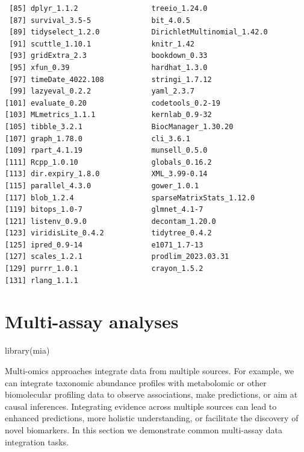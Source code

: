 \documentclass[
]{book}
\newenvironment{Shaded}{\begin{snugshade}}{\end{snugshade}}
\newcommand{\FunctionTok}[1]{\textcolor[rgb]{0.00,0.00,0.00}{#1}}
\newcommand{\NormalTok}[1]{#1}
\begin{document}
\begin{verbatim}
 [85] dplyr_1.1.2                 treeio_1.24.0              
 [87] survival_3.5-5              bit_4.0.5                  
 [89] tidyselect_1.2.0            DirichletMultinomial_1.42.0
 [91] scuttle_1.10.1              knitr_1.42                 
 [93] gridExtra_2.3               bookdown_0.33              
 [95] xfun_0.39                   hardhat_1.3.0              
 [97] timeDate_4022.108           stringi_1.7.12             
 [99] lazyeval_0.2.2              yaml_2.3.7                 
[101] evaluate_0.20               codetools_0.2-19           
[103] MLmetrics_1.1.1             kernlab_0.9-32             
[105] tibble_3.2.1                BiocManager_1.30.20        
[107] graph_1.78.0                cli_3.6.1                  
[109] rpart_4.1.19                munsell_0.5.0              
[111] Rcpp_1.0.10                 globals_0.16.2             
[113] dir.expiry_1.8.0            XML_3.99-0.14              
[115] parallel_4.3.0              gower_1.0.1                
[117] blob_1.2.4                  sparseMatrixStats_1.12.0   
[119] bitops_1.0-7                glmnet_4.1-7               
[121] listenv_0.9.0               decontam_1.20.0            
[123] viridisLite_0.4.2           tidytree_0.4.2             
[125] ipred_0.9-14                e1071_1.7-13               
[127] scales_1.2.1                prodlim_2023.03.31         
[129] purrr_1.0.1                 crayon_1.5.2               
[131] rlang_1.1.1                
\end{verbatim}

\hypertarget{multi-assay-analyses}{%
\chapter{Multi-assay analyses}\label{multi-assay-analyses}}

\begin{Shaded}
\begin{Highlighting}[]
\FunctionTok{library}\NormalTok{(mia)}
\end{Highlighting}
\end{Shaded}

Multi-omics approaches integrate data from multiple sources. For
example, we can integrate taxonomic abundance profiles with
metabolomic or other biomolecular profiling data to observe
associations, make predictions, or aim at causal
inferences. Integrating evidence across multiple sources can lead to
enhanced predictions, more holistic understanding, or facilitate the
discovery of novel biomarkers. In this section we demonstrate common
multi-assay data integration tasks.
\end{document}
